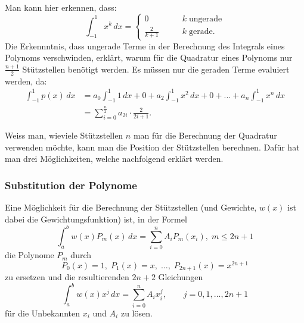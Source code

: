 Man kann hier erkennen, dass:
\begin{equation}
    \int_{-1}^{1} x^{k}\,dx 
    =
    \begin{cases}
        0&\qquad k \; \text{ungerade}\\
        \frac{2}{k+1}&\qquad k \; \text{gerade}.
        \end{cases}  
\end{equation}
Die Erkennntnis, dass ungerade Terme in der Berechnung 
des Integrals eines Polynoms verschwinden, 
erklärt, warum für die Quadratur eines Polynoms nur $\frac{n+1}{2}$ 
Stützstellen benötigt werden. Es müssen nur die geraden Terme evaluiert werden,
da:
\begin{align}
    \int_{-1}^{1} p(x)\,dx 
    &=
    a_{0} \int_{-1}^{1} 1\,dx
    +
    0
    + 
    a_{2}\int_{-1}^{1} x^{2} \,dx  
    +
    0
    +
    ... 
    +
    a_{n}\int_{-1}^{1} x^{n}\,dx
    \\
    &= \sum_{i=0}^{\frac{n}{2}} a_{2i} \cdot \frac{2}{2i+1}.
\end{align}
    


Weiss man, wieviele Stützstellen $n$ man für die Berechnung der Quadratur verwenden möchte,
kann man die Position der Stützstellen berechnen. 
Dafür hat man drei Möglichkeiten, welche nachfolgend erklärt werden.

\subsubsection{Substitution der Polynome}
Eine Möglichkeit für die Berechnung der Stützstellen 
(und Gewichte, $w(x)$ ist dabei die Gewichtungsfunktion) ist, in der Formel
\begin{equation} \label{quadratur:equation:polynomsubstitution}
    \int_{a}^{b}w(x)P_{m}(x)\, dx = \sum_{i=0}^{n}A_{i}P_{m}(x_{i}), \; m \leq 2n + 1
\end{equation}
die Polynome $P_{m}$ durch
\begin{equation}
     P_{0}(x) = 1,\; P_{1}(x) = x,\; \dots ,\; P_{2n+1}(x) = x^{2n+1}
\end{equation}
zu ersetzen und die resultierenden $2n+2$ Gleichungen 
\begin{equation}
    \int_{a}^{b}w(x)x^{j}\,dx = \sum_{i=0}^{n} A_{i}x_{i}^{j},\qquad j = 0, 1, \dots , 2 n + 1
\end{equation}
für die Unbekannten $x_{i}$ und $A_{i}$ zu lösen.


